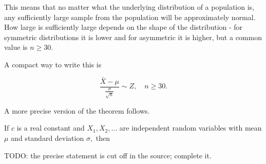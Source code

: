 \documentclass{article}
\begin{document}
This means that no matter what the underlying distribution of a population is, any sufficiently large sample from the population will be approximately normal. How large is sufficiently large depends on the shape of the distribution - for symmetric distributions it is lower and for asymmetric it is higher, but a common value is $n \geq 30.$

A compact way to write this is

\[ \frac{\bar{X} - \mu}{\frac{\sigma}{\sqrt{n}}} \sim Z, \quad n \geq 30. \]

A more precise version of the theorem follows.

\begin{theorem}\label{central-limit-theorem}
If $c$ is a real constant and $X_1, X_2, \dots$ are \@{independent} \@{random variables} with mean $\mu$ and \@{standard deviation} $\sigma,$ then

TODO: the precise statement is cut off in the source; complete it.
\end{theorem}
\end{document}
